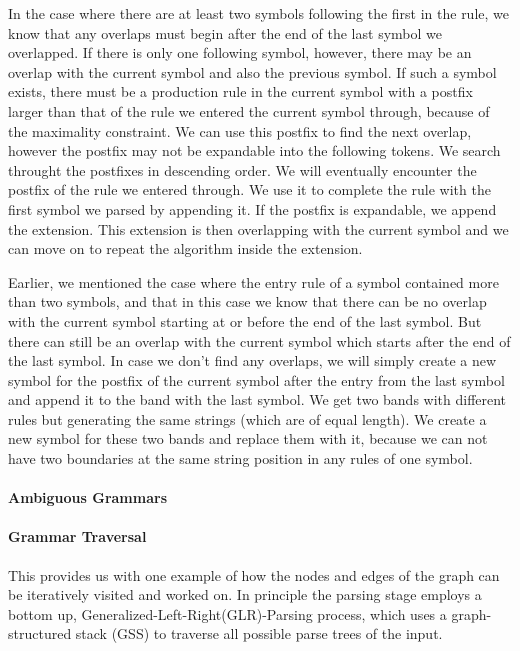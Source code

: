 In the case where there are at least two symbols following the first in the rule, we know that any overlaps must begin 
after the end of the last symbol we overlapped. If there is only one following symbol, however, there may be an overlap 
with the current symbol and also the previous symbol. If such a symbol exists, there must be a production rule in the 
current symbol with a postfix larger than that of the rule we entered the current symbol through, because of the 
maximality constraint. We can use this postfix to find the next overlap, however the postfix may not be expandable into 
the following tokens. We search throught the postfixes in descending order. We will eventually encounter the postfix of 
the rule we entered through. We use it to complete the rule with the first symbol we parsed by appending it. If the 
postfix is expandable, we append the extension. This extension is then overlapping with the current symbol and we can 
move on to repeat the algorithm inside the extension.

Earlier, we mentioned the case where the entry rule of a symbol contained more than two symbols, and that in this case 
we know that there can be no overlap with the current symbol starting at or before the end of the last symbol. But there 
can still be an overlap with the current symbol which starts after the end of the last symbol. In case we don't find any 
overlaps, we will simply create a new symbol for the postfix of the current symbol after the entry from the last symbol 
and append it to the band with the last symbol. We get two bands with different rules but generating the same strings 
(which are of equal length). We create a new symbol for these two bands and replace them with it, because we can not have 
two boundaries at the same string position in any rules of one symbol. 

\paragraph{Ambiguous Grammars}

\paragraph{Grammar Traversal}
This provides us with one example of how the nodes and edges of the graph can be
iteratively visited and worked on.
In principle the parsing stage employs a bottom up, Generalized-Left-Right(GLR)-Parsing 
process, which uses a graph-structured stack (GSS) to traverse all possible parse trees 
of the input.
%

